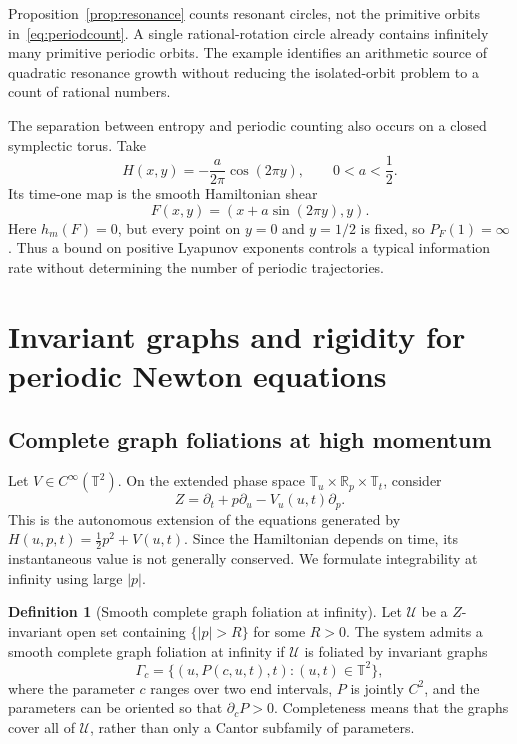 \documentclass[review,12pt,times,a4paper,nopreprintline]{elsarticle}
\theoremstyle{plain}
\theoremstyle{definition}
\newtheorem{definition}[theorem]{Definition}
\theoremstyle{remark}
\newcommand{\T}{\mathbb T}
\newcommand{\R}{\mathbb R}
\numberwithin{equation}{section}
\begin{document}
Proposition~\ref{prop:resonance} counts resonant circles, not the primitive orbits in~\eqref{eq:periodcount}. A single rational-rotation circle already contains infinitely many primitive periodic orbits. The example identifies an arithmetic source of quadratic resonance growth without reducing the isolated-orbit problem to a count of rational numbers.

The separation between entropy and periodic counting also occurs on a closed symplectic torus. Take
\[
 H(x,y)=-\frac{a}{2\pi}\cos(2\pi y),\qquad0<a<\frac12.
\]
Its time-one map is the smooth Hamiltonian shear
\begin{equation}\label{eq:hamiltonshear}
 F(x,y)=(x+a\sin(2\pi y),y).
\end{equation}
Here $h_m(F)=0$, but every point on $y=0$ and $y=1/2$ is fixed, so $P_F(1)=\infty$. Thus a bound on positive Lyapunov exponents controls a typical information rate without determining the number of periodic trajectories.

\section{Invariant graphs and rigidity for periodic Newton equations}\label{sec:Newton}

\subsection{Complete graph foliations at high momentum}
Let $V\in C^\infty(\T^2)$. On the extended phase space $\T_u\times\R_p\times\T_t$, consider
\begin{equation}\label{eq:newtonfield}
 Z=\partial_t+p\partial_u-V_u(u,t)\partial_p.
\end{equation}
This is the autonomous extension of the equations generated by $H(u,p,t)=\tfrac12p^2+V(u,t)$. Since the Hamiltonian depends on time, its instantaneous value is not generally conserved. We formulate integrability at infinity using large $|p|$.

\begin{definition}[Smooth complete graph foliation at infinity]\label{def:highfoliation}
Let $\mathcal U$ be a $Z$-invariant open set containing $\{|p|>R\}$ for some $R>0$. The system admits a smooth complete graph foliation at infinity if $\mathcal U$ is foliated by invariant graphs
\[
 \Gamma_c=\{(u,P(c,u,t),t):(u,t)\in\T^2\},
\]
where the parameter $c$ ranges over two end intervals, $P$ is jointly $C^2$, and the parameters can be oriented so that $\partial_cP>0$. Completeness means that the graphs cover all of $\mathcal U$, rather than only a Cantor subfamily of parameters.
\end{definition}
\end{document}
